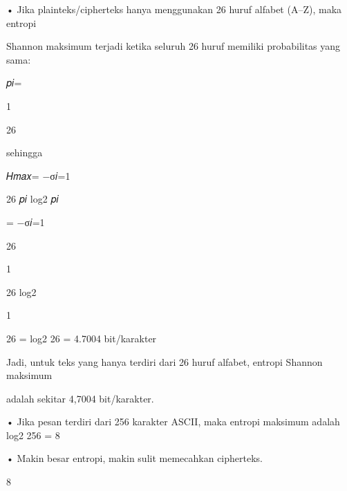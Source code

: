 \documentclass{article}
\begin{document}

• Jika plainteks/cipherteks hanya menggunakan 26 huruf alfabet (A–Z), maka entropi 

Shannon maksimum terjadi ketika seluruh 26 huruf memiliki probabilitas yang sama:

                      𝑝𝑖= 

1

26

   sehingga 


𝐻𝑚𝑎𝑥=  −σ𝑖=1

26 𝑝𝑖 log2 𝑝𝑖 


= −σ𝑖=1

26

1

26 log2

1

26 = log2 26 = 4.7004 bit/karakter

   Jadi, untuk teks yang hanya terdiri dari 26 huruf alfabet, entropi Shannon maksimum  

adalah sekitar 4,7004 bit/karakter.

• Jika pesan terdiri dari 256 karakter ASCII, maka entropi maksimum adalah log2 256 = 8 

• Makin besar entropi, makin sulit memecahkan cipherteks. 

8
\end{document}
